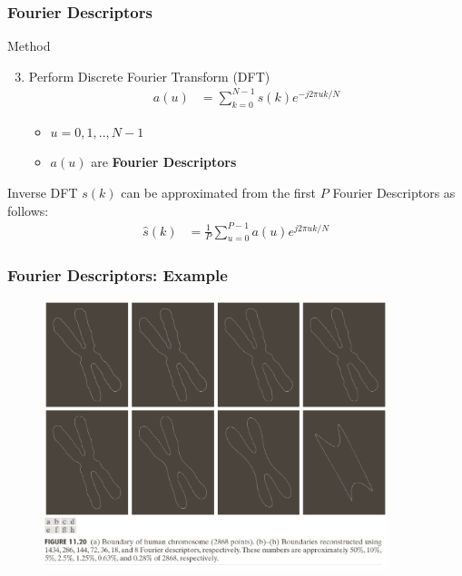 \documentclass[english,11pt,table,handout]{beamer}
\begin{document}
\frame
{
	\frametitle{Fourier Descriptors}

	\begin{block}{Method}
		\begin{enumerate}
			\setcounter{enumi}{2}
			\item Perform Discrete Fourier Transform (DFT)
			\begin{equation}
				\begin{split}
				\nonumber
					a(u) &= \sum_{k=0}^{N-1}{s(k)e^{-j2\pi uk/N}}
				\end{split}
			\end{equation}
			\begin{itemize}
				\item $u = 0, 1, .., N-1$
				\item {\large $a(u)$ are \textbf{Fourier Descriptors}}
			\end{itemize}
			
		\end{enumerate}
	\end{block}
	
	\begin{block}{Inverse DFT}
		$s(k)$ can be approximated from the first $P$ Fourier Descriptors as follows:
		\begin{equation}
		\begin{split}
		\nonumber
			\hat{s}(k)&= \frac{1}{P} \sum_{u=0}^{P-1}{a(u)e^{j2\pi uk/N}}
		\end{split}
		\end{equation}
	\end{block}
}

\frame
{
	\frametitle{Fourier Descriptors: Example}
	
	\begin{figure}[!h]
		\includegraphics[width=10cm]{fourier.png}
	\end{figure}
}
\end{document}

